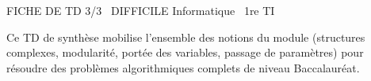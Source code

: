 \documentclass[11pt]{article}
\begin{document}
\begin{tcolorbox}[enhanced,colback=popink,colframe=popink,arc=10pt,boxrule=0pt,left=12pt,right=12pt,top=9pt,bottom=9pt]
{\color{white}\popxbold\small FICHE DE TD 3/3 \textbullet\ DIFFICILE \hfill Informatique \textbullet\ 1re TI\par}
\end{tcolorbox}
\vspace{4pt}
Ce TD de synthèse mobilise l'ensemble des notions du module (structures complexes, modularité, portée des variables, passage de paramètres) pour résoudre des problèmes algorithmiques complets de niveau Baccalauréat.
\end{document}
